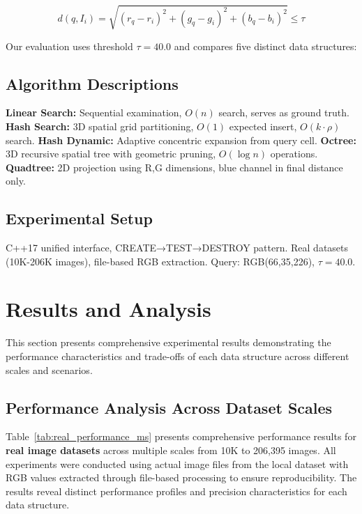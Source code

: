 \documentclass{sbc2023}
\begin{document}
\begin{equation}
d(q, I_i) = \sqrt{(r_q - r_i)^2 + (g_q - g_i)^2 + (b_q - b_i)^2} \leq \tau
\label{eq:euclidean_distance}
\end{equation}

Our evaluation uses threshold $\tau = 40.0$ and compares five distinct data structures:

\subsection{Algorithm Descriptions}

\textbf{Linear Search:} Sequential examination, $O(n)$ search, serves as ground truth. \textbf{Hash Search:} 3D spatial grid partitioning, $O(1)$ expected insert, $O(k \cdot \rho)$ search. \textbf{Hash Dynamic:} Adaptive concentric expansion from query cell. \textbf{Octree:} 3D recursive spatial tree with geometric pruning, $O(\log n)$ operations. \textbf{Quadtree:} 2D projection using R,G dimensions, blue channel in final distance only.

\subsection{Experimental Setup}

C++17 unified interface, CREATE→TEST→DESTROY pattern. Real datasets (10K-206K images), file-based RGB extraction. Query: RGB(66,35,226), $\tau = 40.0$.


\section{Results and Analysis}
\label{sec:results}

This section presents comprehensive experimental results demonstrating the performance characteristics and trade-offs of each data structure across different scales and scenarios.

\subsection{Performance Analysis Across Dataset Scales}

Table~\ref{tab:real_performance_ms} presents comprehensive performance results for \textbf{real image datasets} across multiple scales from 10K to 206,395 images. All experiments were conducted using actual image files from the local dataset with RGB values extracted through file-based processing to ensure reproducibility. The results reveal distinct performance profiles and precision characteristics for each data structure.
\end{document}
